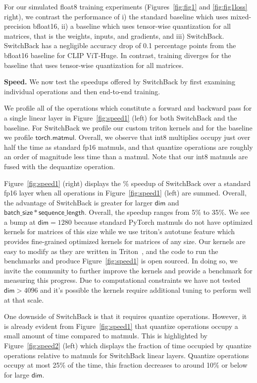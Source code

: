 For our simulated float8 training experiments (Figures~\ref{fig:fig1} and \ref{fig:fig1loss} right), we contrast the performance of i) the standard baseline which uses mixed-precision bfloat16, ii) a baseline which uses tensor-wise quantization for all matrices, that is the weights, inputs, and gradients, and iii) SwitchBack. SwitchBack has a negligible accuracy drop of 0.1 percentage points from the bfloat16 baseline for CLIP ViT-Huge. In contrast, training diverges for the baseline that uses tensor-wise quantization for all matrices.

\textbf{Speed.} We now test the speedups offered by SwitchBack by first examining individual operations and then end-to-end training.

We profile all of the operations which constitute a forward and backward pass for a single linear layer in Figure~\ref{fig:speed1} (left) for both SwitchBack and the baseline. For SwitchBack we profile our custom triton kernels and for the baseline we profile $\mathsf{torch.matmul}$.
Overall, we observe that int8 multiplies occupy just over half the time as standard fp16 matmuls, and that quantize operations are roughly an order of magnitude less time than a matmul. Note that our int8 matmuls are fused with the dequantize operation.

Figure~\ref{fig:speed1} (right) displays the \% speedup of SwitchBack over a standard fp16 layer when all operations in Figure~\ref{fig:speed1} (left) are summed. Overall, the advantage of SwitchBack is greater for larger $\mathsf{dim}$ and $\mathsf{batch\_size}*\mathsf{sequence\_length}$.
Overall, the speedup ranges from 5\% to 35\%.
We see a bump at $\mathsf{dim} = 1280$ because standard PyTorch matmuls do not have optimized kernels for matrices of this size while we use triton's autotune feature which provides fine-grained optimized kernels for matrices of any size. Our kernels are easy to modify as they are written in Triton~\cite{tillet2019triton}, and the code to run the benchmarks and produce Figure~\ref{fig:speed1} is open sourced. In doing so, we invite the community to further improve the kernels and provide a benchmark for measuring this progress. Due to computational constraints we have not tested $\mathsf{dim} > 4096$ and it's possible the kernels require additional tuning to perform well at that scale.

One downside of SwitchBack is that it requires quantize operations. However, it is already evident from Figure~\ref{fig:speed1} that quantize operations occupy a small amount of time compared to matmuls. This is highlighted by Figure~\ref{fig:speed2} (left) which displays the fraction of time occupied by quantize operations relative to matmuls for SwitchBack linear layers. Quantize operations occupy at most 25\% of the time, this fraction decreases to around 10\% or below for large $\mathsf{dim}$.

